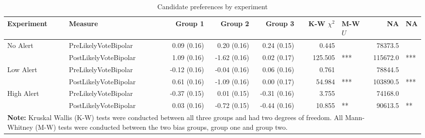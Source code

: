 \begin{table}[ht]
\centering
\caption{Candidate preferences by experiment} 
\begin{tabular}{llrrrrlrl}
  \hline
Experiment & Measure & Group 1 & Group 2 & Group 3 & K-W $\chi^2$ & M-W $U$ & NA & NA \\ 
  \hline
No Alert & PreLikelyVoteBipolar & 0.09 (0.16) & 0.20 (0.16) & 0.24 (0.15) & 0.445 &   & 78373.5 &   \\ 
   & PostLikelyVoteBipolar &  1.09 (0.16) & -1.62 (0.16) &  0.02 (0.17) & 125.505 & *** & 115672.0 & *** \\ 
  Low Alert & PreLikelyVoteBipolar & -0.12 (0.16) & -0.04 (0.16) &  0.06 (0.16) & 0.761 &   & 78844.5 &   \\ 
   & PostLikelyVoteBipolar &  0.61 (0.16) & -1.09 (0.16) &  0.00 (0.17) & 54.984 & *** & 103890.5 & *** \\ 
  High Alert & PreLikelyVoteBipolar & -0.37 (0.15) &  0.01 (0.15) & -0.31 (0.16) & 3.755 &   & 74168.0 &   \\ 
   & PostLikelyVoteBipolar &  0.03 (0.16) & -0.72 (0.15) & -0.44 (0.16) & 10.855 & ** & 90613.5 & ** \\ 
   \hline  \multicolumn{7}{L{16cm}}{\textbf{Note: } 
                                               Kruskal Wallis (K-W) tests were conducted between all three groups 
                                               and had two degrees of freedom. All Mann-Whitney (M-W) tests were
                                               conducted between the two bias groups, group one and group two.} \\ \hline
\end{tabular}
\end{table}
